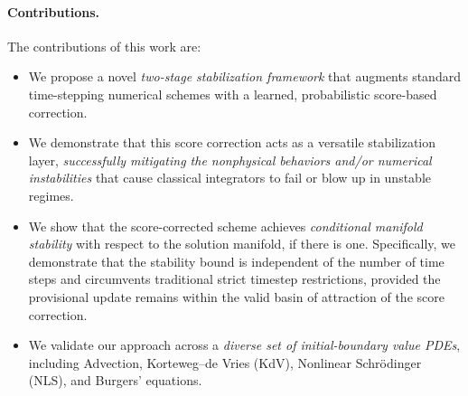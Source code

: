 \documentclass[letterpaper]{article} %
\begin{document}
\paragraph{Contributions.}
The contributions of this work are:
\begin{itemize}
\item We propose a novel \emph{two-stage stabilization framework} that augments standard time-stepping numerical schemes with a learned, probabilistic score-based correction.

\item We demonstrate that this score correction acts as a versatile stabilization layer, \emph{successfully mitigating the nonphysical behaviors and/or numerical instabilities} that cause classical integrators to fail or blow up in unstable regimes.

\item We show that the score-corrected scheme achieves \emph{conditional manifold stability} with respect to the solution manifold, if there is one. Specifically, we demonstrate that the stability bound is independent of the number of time steps and circumvents traditional strict timestep restrictions, provided the provisional update remains within the valid basin of attraction of the score correction.

\item We validate our approach across a \emph{diverse set of initial-boundary value PDEs}, including Advection, Korteweg--de Vries (KdV), Nonlinear Schrödinger (NLS), and Burgers' equations.




\end{itemize}
\end{document}
